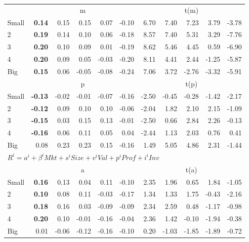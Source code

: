 \begin{tabular}{lrrrrrrrrrr}
  
     & \multicolumn{5}{c}{m} & \multicolumn{5}{c}{t(m)}   \\
     \cmidrule(r){2-6} \cmidrule(r){7-11} 
    Small  & \textbf{0.14}  & 0.15  & 0.15  & 0.07  & -0.10  & 6.70  & 7.40  & 7.23  & 3.79  & -3.78   \\
    2  & \textbf{0.19}  & 0.14  & 0.10  & 0.06  & -0.18  & 8.57  & 7.40  & 5.31  & 3.29  & -7.76   \\
    3  & \textbf{0.20}  & 0.10  & 0.09  & 0.01  & -0.19  & 8.62  & 5.46  & 4.45  & 0.59  & -6.90   \\
    4  & \textbf{0.20}  & 0.09  & 0.05  & -0.03  & -0.20  & 8.11  & 4.41  & 2.44  & -1.25  & -5.87   \\
    Big  & \textbf{0.15}  & 0.06  & -0.05  & -0.08  & -0.24  & 7.06  & 3.72  & -2.76  & -3.32  & -5.91   \\
    
  
     & \multicolumn{5}{c}{p} & \multicolumn{5}{c}{t(p)}   \\
     \cmidrule(r){2-6} \cmidrule(r){7-11} 
    Small  & \textbf{-0.13}  & -0.02  & -0.01  & -0.07  & -0.16  & -2.50  & -0.45  & -0.28  & -1.42  & -2.17   \\
    2  & \textbf{-0.12}  & 0.09  & 0.10  & 0.10  & -0.06  & -2.04  & 1.82  & 2.10  & 2.15  & -1.09   \\
    3  & \textbf{-0.15}  & 0.03  & 0.15  & 0.13  & -0.01  & -2.50  & 0.66  & 2.84  & 2.26  & -0.13   \\
    4  & \textbf{-0.16}  & 0.06  & 0.11  & 0.05  & 0.04  & -2.44  & 1.13  & 2.03  & 0.76  & 0.41   \\
    Big  & 0.08  & 0.23  & 0.23  & 0.15  & -0.16  & 1.49  & 5.05  & 4.86  & 2.31  & -1.44   \\
    

  \midrule
  \multicolumn{11}{l}{$R^i=a^i+\beta^iMkt+s^iSize+v^iVal+p^iProf+i^iInv$}  \\
  
     & \multicolumn{5}{c}{a} & \multicolumn{5}{c}{t(a)}   \\
     \cmidrule(r){2-6} \cmidrule(r){7-11} 
    Small  & \textbf{0.16}  & 0.13  & 0.04  & 0.11  & -0.10  & 2.35  & 1.96  & 0.65  & 1.84  & -1.05   \\
    2  & \textbf{0.10}  & 0.08  & 0.11  & -0.03  & -0.17  & 1.34  & 1.33  & 1.75  & -0.43  & -2.16   \\
    3  & \textbf{0.18}  & 0.16  & 0.03  & -0.09  & -0.09  & 2.34  & 2.59  & 0.48  & -1.17  & -0.98   \\
    4  & \textbf{0.20}  & 0.10  & -0.01  & -0.16  & -0.04  & 2.36  & 1.42  & -0.10  & -1.94  & -0.38   \\
    Big  & 0.01  & -0.06  & -0.12  & -0.16  & -0.10  & 0.20  & -1.03  & -1.85  & -1.89  & -0.72   \\

  \bottomrule
\end{tabular}
